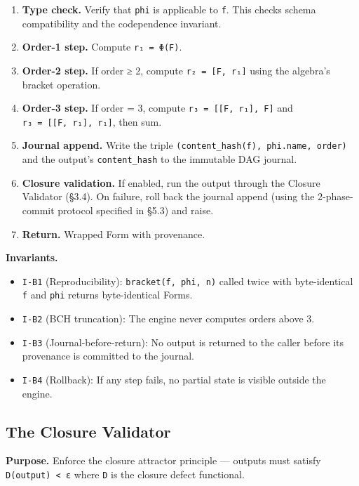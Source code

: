 \documentclass[11pt,a4paper]{article}
\providecommand{\tightlist}{\setlength{\itemsep}{0pt}\setlength{\parskip}{0pt}}
\begin{document}
\begin{enumerate}
\def\labelenumi{\arabic{enumi}.}
\tightlist
\item
  \textbf{Type check.} Verify that \texttt{phi} is applicable to
  \texttt{f}. This checks schema compatibility and the codependence
  invariant.
\item
  \textbf{Order-1 step.} Compute \texttt{r₁\ =\ Φ(F)}.
\item
  \textbf{Order-2 step.} If order ≥ 2, compute
  \texttt{r₂\ =\ {[}F,\ r₁{]}} using the algebra's bracket operation.
\item
  \textbf{Order-3 step.} If order = 3, compute
  \texttt{r₃\ =\ {[}{[}F,\ r₁{]},\ F{]}} and
  \texttt{r₃\textquotesingle{}\ =\ {[}{[}F,\ r₁{]},\ r₁{]}}, then sum.
\item
  \textbf{Journal append.} Write the triple
  \texttt{(content\_hash(f),\ phi.name,\ order)} and the output's
  \texttt{content\_hash} to the immutable DAG journal.
\item
  \textbf{Closure validation.} If enabled, run the output through the
  Closure Validator (§3.4). On failure, roll back the journal append
  (using the 2-phase-commit protocol specified in §5.3) and raise.
\item
  \textbf{Return.} Wrapped Form with provenance.
\end{enumerate}

\textbf{Invariants.}

\begin{itemize}
\tightlist
\item
  \texttt{I-B1} (Reproducibility): \texttt{bracket(f,\ phi,\ n)} called
  twice with byte-identical \texttt{f} and \texttt{phi} returns
  byte-identical Forms.
\item
  \texttt{I-B2} (BCH truncation): The engine never computes orders above
  3.
\item
  \texttt{I-B3} (Journal-before-return): No output is returned to the
  caller before its provenance is committed to the journal.
\item
  \texttt{I-B4} (Rollback): If any step fails, no partial state is
  visible outside the engine.
\end{itemize}

\hypertarget{the-closure-validator}{%
\subsection{The Closure Validator}\label{the-closure-validator}}

\textbf{Purpose.} Enforce the closure attractor principle --- outputs
must satisfy \texttt{D(output)\ \textless{}\ ε} where \texttt{D} is the
closure defect functional.
\end{document}
